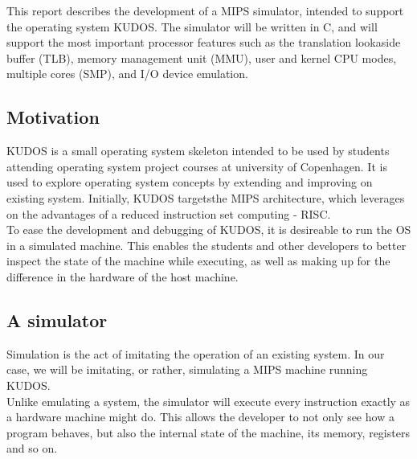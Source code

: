 This report describes the development of a MIPS simulator, intended to support
the operating system KUDOS. The simulator will be written in C, and will
support the most important processor features such as the translation
lookaside
buffer (TLB), memory management unit (MMU), user and kernel CPU modes,
multiple
cores (SMP), and I/O device emulation. \\


\subsection{Motivation}
KUDOS is a small operating system skeleton intended to be used by students
attending operating system project courses at university of Copenhagen.
It is used to explore operating system concepts by extending and improving on
existing system.
Initially, KUDOS targetsthe MIPS architecture, which leverages on the
advantages of a
reduced instruction set computing - RISC.\\
To ease the development and debugging of KUDOS, it is desireable to run the OS
in a simulated machine. This enables the students and other developers to
better inspect the state of the machine while executing, as well as making up
for the difference in the hardware of the host machine.

\subsection{A simulator}
Simulation is the act of imitating the operation of an existing system. In our
case, we will be imitating, or rather, simulating a MIPS machine running
KUDOS.\\
Unlike emulating a system, the simulator will execute every instruction
exactly
as a hardware machine might do. This allows the developer to not only see how
a program behaves, but also the internal state of the machine, its memory,
registers and so on.\\

